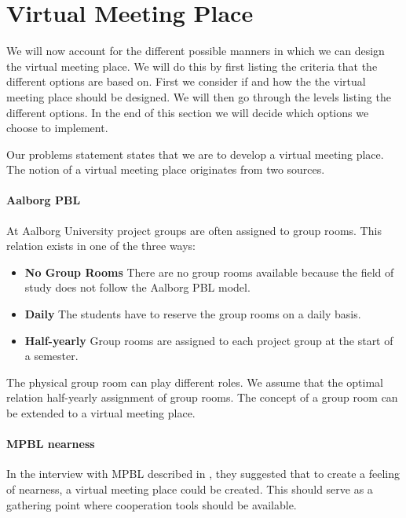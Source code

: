 \section{Virtual Meeting Place}
\label{sec:virtualMeetingPlace}
\label{sec:projectgroup}

We will now account for the different possible manners in which we can design the virtual meeting place. 
We will do this by first listing the criteria that the different options are based on. 
First we consider if and how the the virtual meeting place should be designed.
We will then go through the levels listing the different options. 
In the end of this section we will decide which options we choose to implement.

Our problems statement states that we are to develop a virtual meeting place. 
The notion of a virtual meeting place originates from two sources.

\paragraph{Aalborg PBL} 
At Aalborg University project groups are often assigned to group rooms. This relation exists in one of the three ways:
\begin{itemize}
	\item \textbf{No Group Rooms} There are no group rooms available because the field of study does not follow the Aalborg PBL model.
	\item \textbf{Daily} The students have to reserve the group rooms on a daily basis.
	\item \textbf{Half-yearly} Group rooms are assigned to each project group at the start of a semester.
\end{itemize} 
The physical group room can play different roles. 
We assume that the optimal relation half-yearly assignment of group rooms.
The concept of a group room can be extended to a virtual meeting place.  

\paragraph{MPBL nearness}
In the interview with MPBL described in , they suggested that to create a feeling of nearness, a virtual meeting place could be created. 
This should serve as a gathering point where cooperation tools should be available. \\

